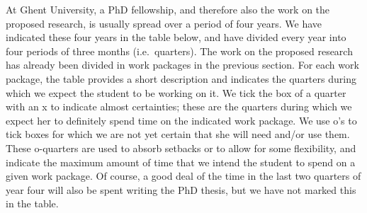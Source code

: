 \documentclass[11pt,dvipsnames,usenames,a4paper]{article}
\begin{document}
At Ghent University, a PhD fellowship, and therefore also the work on the proposed research, is usually spread over a period of four years.
We have indicated these four years in the table below, and have divided every year into four periods of three months (i.e.~quarters).
The work on the proposed research has already been divided in work packages in the previous section.
For each work package, the table provides a short description and indicates the quarters during which we expect the student to be working on it.
We tick the box of a quarter with an x to indicate almost certainties; these are the quarters during which we expect her to definitely spend time on the indicated work package.
We use o's to tick boxes for which we are not yet certain that she will need and/or use them.
These o-quarters are used to absorb setbacks or to allow for some flexibility, and indicate the maximum amount of time that we intend the student to spend on a given work package.
Of course, a good deal of the time in the last two quarters of year four will also be spent writing the PhD thesis, but we have not marked this in the table.

\vspace{10pt}
\begin{center}
\end{center}
\vspace{6pt}
\end{document}

